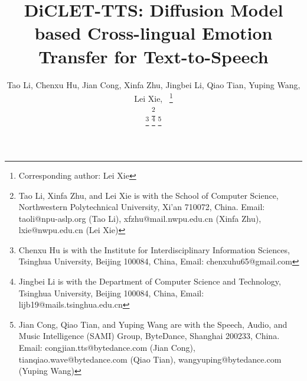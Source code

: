 \documentclass[journal,comsoc]{IEEEtran}
\begin{document}
%
\title{DiCLET-TTS: Diffusion Model based Cross-lingual Emotion Transfer for Text-to-Speech}
%
\author{Tao Li,
        Chenxu Hu,
        Jian Cong,
        Xinfa Zhu,
        Jingbei Li,
        Qiao Tian,
        Yuping Wang,
        Lei Xie,~
\vspace{-0.4cm}
 \thanks{Corresponding author: Lei Xie}

\thanks{Tao Li, Xinfa Zhu, and Lei Xie is with the School of Computer Science, Northwestern Polytechnical University, Xi’an 710072, China. Email: taoli@npu-aslp.org (Tao Li), xfzhu@mail.nwpu.edu.cn (Xinfa Zhu), lxie@nwpu.edu.cn (Lei Xie)}

\thanks{Chenxu Hu is with the Institute for Interdisciplinary Information Sciences, Tsinghua University, Beijing 100084, China, Email: chenxuhu65@gmail.com}
\thanks{Jingbei Li is with the Department of Computer Science and Technology, Tsinghua University, Beijing 100084, China, Email: lijb19@mails.tsinghua.edu.cn}
\thanks{Jian Cong, Qiao Tian, and Yuping Wang are with the Speech, Audio, and Music Intelligence (SAMI) Group, ByteDance, Shanghai 200233, China. Email: congjian.tts@bytedance.com (Jian Cong), tianqiao.wave@bytedance.com (Qiao Tian), wangyuping@bytedance.com (Yuping Wang)}
    }


% 
\end{document}
